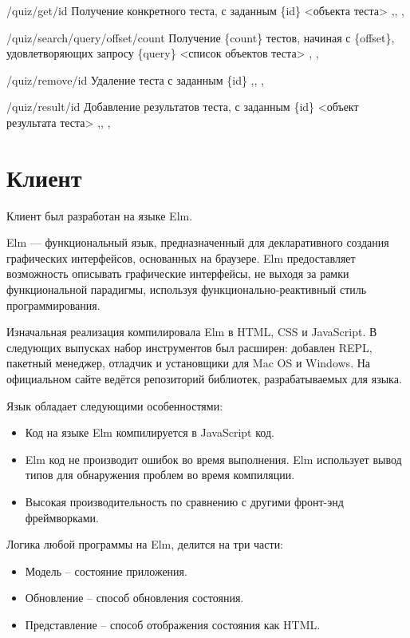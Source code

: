  {/quiz/get/{id}}
{Получение конкретного теста, с заданным \{id\}}
{}
{<объекта теста>}
{ \sep {}\sep {}  \sep {}}

 {/quiz/search/{query}/{offset}/{count}}
{Получение \{count\} тестов, начиная с \{offset\}, удовлетворяющих запросу \{query\}}
{}
{<список объектов теста>}
{ \sep {} \sep {}}

 {/quiz/remove/{id}}
{Удаление теста с заданным \{id\}}
{}
{}
{ \sep {}\sep  {}   \sep {}}

 {/quiz/result/{id}}
{Добавление результатов теста, с заданным \{id\}}
{<объект результата теста>}
{}
{ \sep {}\sep  {}   \sep {}}

\section{Клиент}

Клиент был разработан на языке Elm. 

Elm — функциональный язык, предназначенный для декларативного создания графических интерфейсов, основанных на браузере. Elm предоставляет возможность описывать графические интерфейсы, не выходя за рамки функциональной парадигмы, используя функционально-реактивный стиль программирования.

Изначальная реализация компилировала Elm в HTML, CSS и JavaScript. В следующих выпусках набор инструментов был расширен: добавлен REPL, пакетный менеджер, отладчик и установщики для Mac OS и Windows. На официальном сайте ведётся репозиторий библиотек, разрабатываемых для языка.

Язык обладает следующими особенностями:
\begin{itemize}
	\item Код на языке Elm компилируется в JavaScript код.
	\item Elm код не производит ошибок во время выполнения. Elm использует вывод типов для обнаружения проблем во время компиляции.
	\item Высокая производительность по сравнению с другими фронт-энд фреймворками.
\end{itemize}

Логика любой программы на Elm, делится на три части:
\begin{itemize}
	\item Модель -- состояние приложения.
	\item Обновление -- способ обновления состояния.
	\item Представление -- способ отображения состояния как HTML.
\end{itemize}

